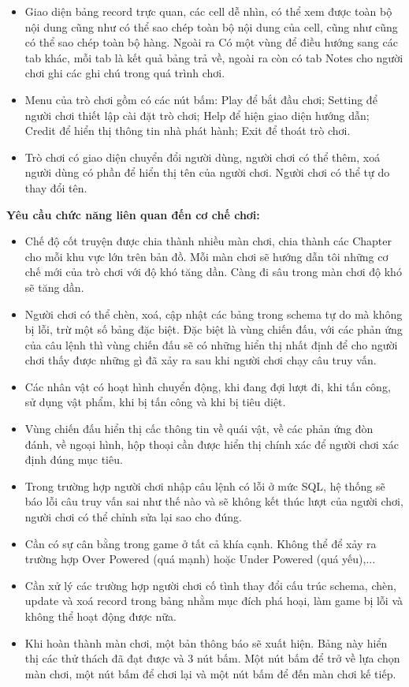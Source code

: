 \begin{itemize}
	\item Giao diện bảng record trực quan, các cell dễ nhìn, có thể xem được toàn bộ nội dung cũng như có thể sao chép toàn bộ nội dung của cell, cũng như cũng có thể sao chép toàn bộ hàng. Ngoài ra Có một vùng để điều hướng sang các tab khác, mỗi tab là kết quả bảng trả về, ngoài ra còn có tab Notes cho người chơi ghi các ghi chú trong quá trình chơi.
	\item Menu của trò chơi gồm có các nút bấm: Play để bắt đầu chơi; Setting để người chơi thiết lập cài đặt trò chơi; Help để hiện giao diện hướng dẫn; Credit để hiển thị thông tin nhà phát hành; Exit để thoát trò chơi.
	\item Trò chơi có giao diện chuyển đổi người dùng, người chơi có thể thêm, xoá người dùng có phần để hiển thị tên của người chơi. Người chơi có thể tự do thay đổi tên.
\end{itemize}

\textbf{Yêu cầu chức năng liên quan đến cơ chế chơi:}
\begin{itemize}
	\item Chế độ cốt truyện được chia thành nhiều màn chơi, chia thành các Chapter cho mỗi khu vực lớn trên bản đồ. Mỗi màn chơi sẽ hướng dẫn tôi những cơ chế mới của trò chơi với độ khó tăng dần. Càng đi sâu trong màn chơi độ khó sẽ tăng dần. 
	\item Người chơi có thể chèn, xoá, cập nhật các bảng trong schema tự do mà không bị lỗi, trừ một số bảng đặc biệt. Đặc biệt là vùng chiến đấu, với các phản ứng của câu lệnh thì vùng chiến đấu sẽ có những hiển thị nhất định để cho người chơi thấy được những gì đã xảy ra sau khi người chơi chạy câu truy vấn.
	\item Các nhân vật có hoạt hình chuyển động, khi đang đợi lượt đi, khi tấn công, sử dụng vật phẩm, khi bị tấn công và khi bị tiêu diệt.
	\item Vùng chiến đấu hiển thị cấc thông tin về quái vật, về các phản ứng đòn đánh, về ngoại hình, hộp thoại cần được hiển thị chính xác để người chơi xác định đúng mục tiêu.
	\item Trong trường hợp người chơi nhập câu lệnh có lỗi ở mức SQL, hệ thống sẽ báo lỗi câu truy vấn sai như thế nào và sẽ không kết thúc lượt của người chơi, người chơi có thể chỉnh sửa lại sao cho đúng. 
	\item Cần có sự cân bằng trong game ở tất cả khía cạnh. Không thể để xảy ra trường hợp Over Powered (quá mạnh) hoặc Under Powered (quá yếu),...
	\item Cần xử lý các trường hợp người chơi cố tình thay đổi cấu trúc schema, chèn, update và xoá record trong bảng nhằm mục đích phá hoại, làm game bị lỗi và không thể hoạt động được nữa.
	\item Khi hoàn thành màn chơi, một bản thông báo sẽ xuất hiện. Bảng này hiển thị các thử thách đã đạt được và 3 nút bấm. Một nút bấm để trở về lựa chọn màn chơi, một nút bấm để chơi lại và một nút bấm để đến màn chơi kế tiếp.
	
\end{itemize}


